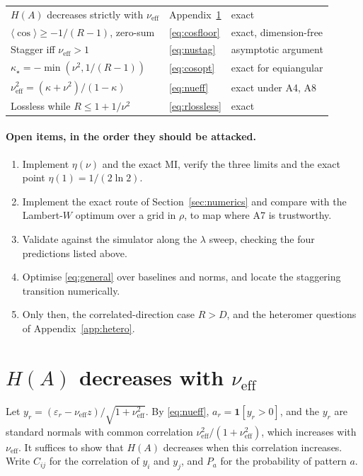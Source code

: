 \documentclass[11pt,a4paper]{article}
\newcommand{\nueff}{\nu_{\mathrm{eff}}}
\begin{document}
\begin{center}
\begin{tabular}{lll}
$H(A)$ decreases strictly with $\nueff$ & Appendix~\ref{app:mono} & exact \\
$\langle\cos\rangle\ge-1/(R-1)$, zero-sum & \eqref{eq:cosfloor} & exact, dimension-free \\
Stagger iff $\nueff>1$ & \eqref{eq:nustag} & asymptotic argument \\
$\kappa_\star=-\min(\nu^2,1/(R-1))$ & \eqref{eq:cosopt} & exact for equiangular \\
$\nueff^2=(\kappa+\nu^2)/(1-\kappa)$ & \eqref{eq:nueff} & exact under A4, A8 \\
Lossless while $R\le1+1/\nu^2$ & \eqref{eq:rlossless} & exact \\

\bottomrule
\end{tabular}
\end{center}

\paragraph{Open items, in the order they should be attacked.}
\begin{enumerate}
  \item Implement $\eta(\nu)$ and the exact MI, verify the three limits and the exact
    point $\eta(1)=1/(2\ln2)$.
  \item Implement the exact route of Section~\ref{sec:numerics} and compare with the
    Lambert-$W$ optimum over a grid in $\rho$, to map where A7 is trustworthy.
  \item Validate against the simulator along the $\lambda$ sweep, checking the four
    predictions listed above.
  \item Optimise \eqref{eq:general} over baselines and norms, and locate the staggering
    transition numerically.
  \item Only then, the correlated-direction case $R>D$, and the heteromer questions of
    Appendix~\ref{app:hetero}.
\end{enumerate}

\appendix

\section{\texorpdfstring{$H(A)$}{H(A)} decreases with \texorpdfstring{$\nueff$}{nu\_eff}}
\label{app:mono}

Let $y_r=(\varepsilon_r-\nueff z)/\sqrt{1+\nueff^2}$. By \eqref{eq:nueff},
$a_r=\mathbf 1[y_r>0]$, and the $y_r$ are standard normals with common correlation
$\nueff^2/(1+\nueff^2)$, which increases with $\nueff$. It suffices to show that $H(A)$
decreases when this correlation increases. Write $C_{ij}$ for the correlation of $y_i$ and
$y_j$, and $P_a$ for the probability of pattern $a$.
\end{document}
